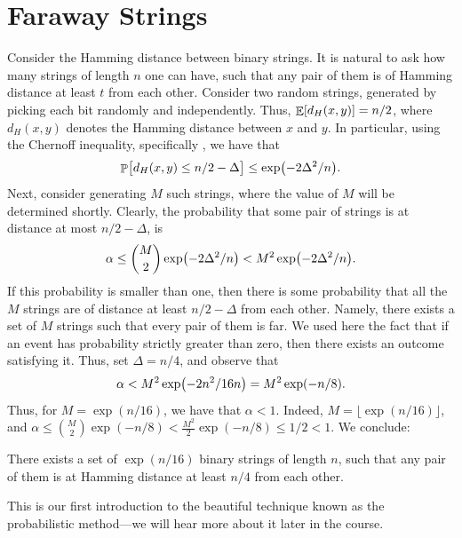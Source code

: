 \section{Faraway Strings}

Consider the Hamming distance between binary strings. It is natural to
ask how many strings of length $n$ one can have, such that any pair of
them is of Hamming distance at least $t$ from each other. Consider
two random strings, generated by picking each bit randomly and
independently. Thus, $\mathop{\mathbb{E}}\!\left[ {d_H(x,y)} \right] = n/2$, where $d_H(x,y)$ denotes
the Hamming distance between $x$ and $y$. In particular, using the
Chernoff inequality, specifically , we have that
\begin{equation*}
    \Prob{\bigl.d_H(x,y) \leq n/2 - \Delta} \leq \exp\pth{ -2\Delta^2 /n}.
\end{equation*}
Next, consider generating $M$ such strings, where the value of $M$
will be determined shortly. Clearly, the probability that some pair of
strings is at distance at most $n/2 - \Delta$, is
\begin{equation*}
    \alpha \leq \binom{M}{2} \exp\pth{ -2\Delta^2 /n} < M^2 \exp\pth{
       -2\Delta^2 /n}.
\end{equation*}
If this probability is smaller than one, then there is some
probability that all the $M$ strings are of distance at least $n/2 -
\Delta$ from each other. Namely, there exists a set of $M$ strings
such that every pair of them is far. We used here the fact that if an
event has probability strictly greater than zero, then there exists
an outcome satisfying it. Thus, set $\Delta = n/4$, and observe that
\begin{equation*}
    \alpha < M^2 \exp\pth{ -2n^2 /16n} = M^2 \exp\pth{ -n /8}.
\end{equation*}
Thus, for $M = \exp(n/16)$, we have that $\alpha < 1$. Indeed,
$M = \lfloor \exp(n/16) \rfloor$, and
$\alpha \leq \binom{M}{2}\exp(-n/8) < \frac{M^2}{2}\exp(-n/8) \leq 1/2 <
1$.  We conclude:
\begin{lemma}
    There exists a set of $\exp(n/16)$ binary strings of length $n$,
    such that any pair of them is at Hamming distance at least $n/4$
    from each other.
\end{lemma}

This is our first introduction to the beautiful technique known as the
probabilistic method---we will hear more about it later in the
course.


